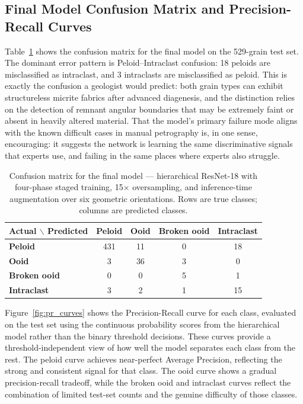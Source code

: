 \documentclass[a4paper,fleqn]{cas-dc}
\begin{document}
\subsection{Final Model Confusion Matrix and Precision-Recall Curves}
Table~\ref{tab:confusion} shows the confusion matrix for the final model on the 529-grain test set. The dominant error pattern is Peloid--Intraclast confusion: 18 peloids are misclassified as intraclast, and 3 intraclasts are misclassified as peloid. This is exactly the confusion a geologist would predict: both grain types can exhibit structureless micrite fabrics after advanced diagenesis, and the distinction relies on the detection of remnant angular boundaries that may be extremely faint or absent in heavily altered material. That the model's primary failure mode aligns with the known difficult cases in manual petrography is, in one sense, encouraging: it suggests the network is learning the same discriminative signals that experts use, and failing in the same places where experts also struggle.

\begin{table}[h]
\centering
\caption{Confusion matrix for the final model --- hierarchical ResNet-18 with four-phase staged training, 15$\times$ oversampling, and inference-time augmentation over six geometric orientations. Rows are true classes; columns are predicted classes.}
\label{tab:confusion}
\begin{tabular*}{\tblwidth}{@{}lcccc@{}}
\toprule
\textbf{Actual $\backslash$ Predicted} & \textbf{Peloid} & \textbf{Ooid} & \textbf{Broken ooid} & \textbf{Intraclast} \\
\midrule
\textbf{Peloid}       & 431 & 11 & 0 & 18 \\
\textbf{Ooid}         &   3 & 36 & 3 &  0 \\
\textbf{Broken ooid}  &   0 &  0 & 5 &  1 \\
\textbf{Intraclast}   &   3 &  2 & 1 & 15 \\
\bottomrule
\end{tabular*}
\end{table}

Figure~\ref{fig:pr_curves} shows the Precision-Recall curve for each class, evaluated on the test set using the continuous probability scores from the hierarchical model rather than the binary threshold decisions. These curves provide a threshold-independent view of how well the model separates each class from the rest. The peloid curve achieves near-perfect Average Precision, reflecting the strong and consistent signal for that class. The ooid curve shows a gradual precision-recall tradeoff, while the broken ooid and intraclast curves reflect the combination of limited test-set counts and the genuine difficulty of those classes.
\end{document}
